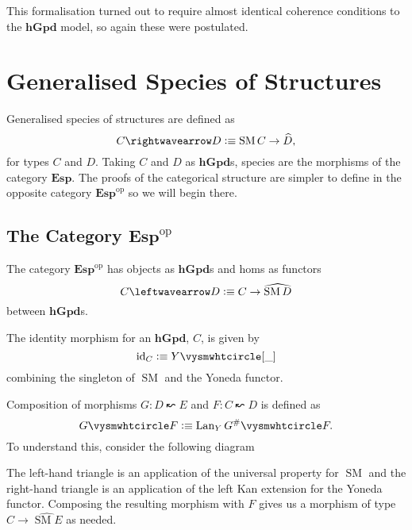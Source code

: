 \documentclass[12pt, parskip, DIV=14]{scrbook}
\newcommand{\defeq}{\vcentcolon\equiv}
\renewcommand{\circ}{\vysmwhtcircle}
\newcommand{\SM}{\operatorname{SM}}
\newcommand{\hGpd}{\mathbf{hGpd}}
\newcommand{\Lan}{\operatorname{Lan}}
\newcommand{\Esp}{\mathbf{Esp}}
\newcommand{\op}[1]{#1^\mathrm{op}}
\newcommand{\id}{\operatorname{id}}
\begin{document}
This formalisation turned out to require almost identical coherence conditions to the $\hGpd$ model, so again these were postulated.

\chapter{Generalised Species of Structures}

Generalised species of structures \citep{fiore2008cartesian} are defined as
$$C \rightwavearrow D \defeq \SM C \to \widehat{D},$$
for types $C$ and $D$. Taking $C$ and $D$ as $\hGpd$s, species are the morphisms of the category $\Esp$. The proofs of the categorical structure are simpler to define in the opposite category $\op\Esp$ so we will begin there.

\section{The Category $\op\Esp$}

The category $\op\Esp$ has objects as $\hGpd$s and homs as functors
$$C \leftwavearrow D \defeq C \to \widehat{\SM D}$$
between $\hGpd$s.

The identity morphism for an $\hGpd$, $C$, is given by
$$\id_C \defeq Y \circ [\_]$$
combining the singleton of $\SM$ and the Yoneda functor.

Composition of morphisms $G : D \leftwavearrow E$ and $F : C \leftwavearrow D$ is defined as
$$G \circ F \defeq \Lan_Y G^\# \circ F.$$
To understand this, consider the following diagram
\begin{center}
\end{center}
The left-hand triangle is an application of the universal property for $\SM$ and the right-hand triangle is an application of the left Kan extension for the Yoneda functor. Composing the resulting morphism with $F$ gives us a morphism of type $C \to \widehat{\SM E}$ as needed.
\end{document}
